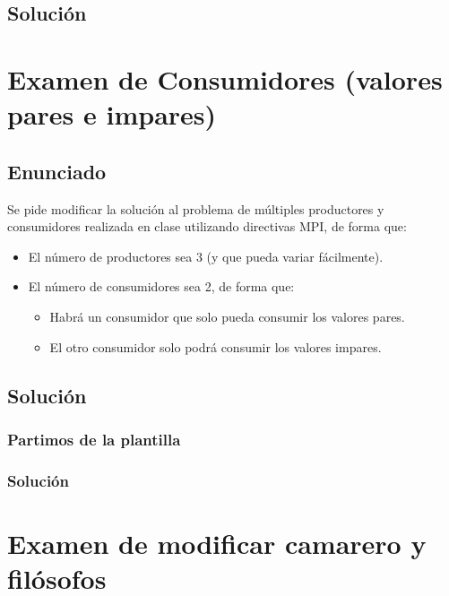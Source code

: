 \documentclass[a4paper,12pt]{article}
\begin{document}
\subsection{Solución}


\section{Examen de Consumidores (valores pares e impares)}

\subsection{Enunciado}
Se pide modificar la solución al problema de múltiples productores y consumidores realizada en clase utilizando directivas MPI, de forma que:

\begin{itemize}
    \item El número de productores sea 3 (y que pueda variar fácilmente).
    \item El número de consumidores sea 2, de forma que:
    \begin{itemize}
        \item Habrá un consumidor que solo pueda consumir los valores pares.
        \item El otro consumidor solo podrá consumir los valores impares.
    \end{itemize}
\end{itemize}

\subsection{Solución}
\subsubsection{Partimos de la plantilla}

\subsubsection{Solución}


\section{Examen de modificar camarero y filósofos}
\end{document}
